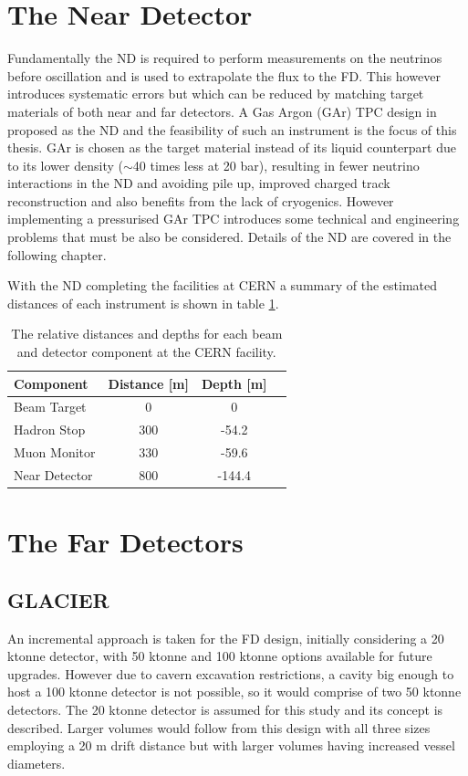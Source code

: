 \section{The Near Detector}
Fundamentally the ND is required to perform measurements on the neutrinos before oscillation and is used to extrapolate the flux to the FD. This however introduces systematic errors but which can be reduced by matching target materials of both near and far detectors. A Gas Argon (GAr) TPC design in proposed as the ND and the feasibility of such an instrument is the focus of this thesis. GAr is chosen as the target material instead of its liquid counterpart due to its lower density ($\sim$40 times less at 20 bar), resulting in fewer neutrino interactions in the ND and avoiding pile up, improved charged track reconstruction and also benefits from the lack of cryogenics. However implementing a pressurised GAr TPC introduces some technical and engineering problems that must be also be considered. Details of the ND are covered in the following chapter.

With the ND completing the facilities at CERN a summary of the estimated distances of each instrument is shown in table \ref{tab:cernFacility}. 

\begin{table}[htbp]
\begin{center}
  \begin{tabular}{l*{2}{c}r}
  \hline
  \textbf{Component} & \textbf{Distance [m]} & \textbf{Depth [m]} \\
    \hline
  \hline
    Beam Target & 0 & 0 \\
    Hadron Stop & 300 & -54.2 \\
    Muon Monitor & 330 & -59.6 \\
    Near Detector & 800 & -144.4 \\
    \hline
  \end{tabular}
      \caption{The relative distances and depths for each beam and detector component at the CERN facility.}
    \label{tab:cernFacility}
\end{center}
    \end{table}

\section{The Far Detectors}
\subsection{GLACIER}
An incremental approach is taken for the FD design, initially considering a 20 ktonne detector, with 50 ktonne and 100 ktonne options available for future upgrades. However due to cavern excavation restrictions, a cavity big enough to host a 100 ktonne detector is not possible, so it would comprise of two 50 ktonne detectors. The 20 ktonne detector is assumed for this study and its concept is described. Larger volumes would follow from this design with all three sizes employing a 20 m drift distance but with larger volumes having increased vessel diameters.

